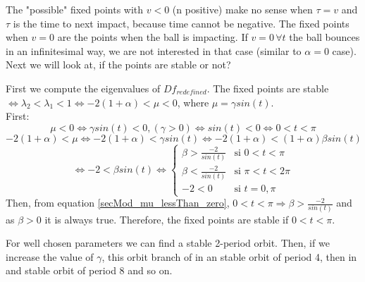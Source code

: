 \documentclass[a4paper]{article}
\begin{document}
The "possible" fixed points with $v<0$ (n positive) make no sense when $\tau=v$ and $\tau$ is the time to next impact, because time cannot be negative.
The fixed points when $v=0$ are the points when the ball is impacting.
If $v=0 \, \forall t$ the ball bounces in an infinitesimal way,
we are not interested in that case (similar to $\alpha=0$ case).
\\
Next we will look at, if the points are stable or not?

First we compute the eigenvalues of $Df_{redefined}$.
The fixed points are stable $\Leftrightarrow \lambda_2<\lambda_1<1 \Leftrightarrow -2(1+\alpha)<\mu<0$,
where $\mu=\gamma sin(t)$.
\\First:
\begin{equation}\label{secMod_mu_lessThan_zero}
\mu<0\Leftrightarrow \gamma sin(t)<0, (\gamma>0) \Leftrightarrow sin(t)<0 \Leftrightarrow 0<t<\pi
\end{equation}
$$-2(1+\alpha)<\mu \Leftrightarrow -2(1+\alpha)<\gamma sin(t) \Leftrightarrow -2(1+\alpha)<(1+\alpha)\beta sin(t) $$
\begin{equation}
\Leftrightarrow -2<\beta sin(t) \Leftrightarrow
\left\{
\begin{array}{cl}
\beta>\frac{-2}{sin(t)}&\mbox{si } 0 < t < \pi \\
\beta<\frac{-2}{sin(t)}&\mbox{si } \pi < t < 2\pi \\
-2<0 &\mbox{si } t=0,\pi
\end{array}\right.
\end{equation}
Then, from equation \ref{secMod_mu_lessThan_zero},
$0<t<\pi \Rightarrow \beta>\frac{-2}{sin(t)}$ and as $\beta>0$ it is always true.
Therefore, the fixed points are stable if $0<t<\pi$.

For well chosen parameters we can find a stable 2-period orbit.
Then, if we increase the value of $\gamma$, this orbit branch of in an stable orbit of period 4, then in and stable orbit of period 8 and so on.
\end{document}
